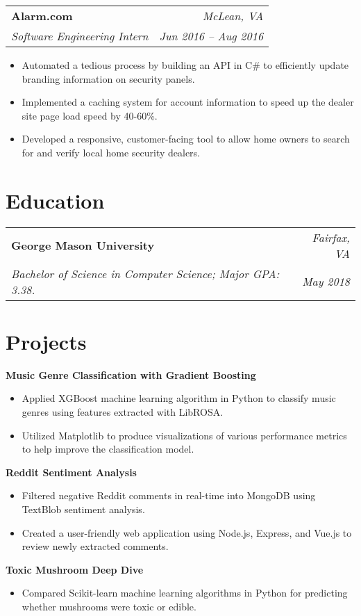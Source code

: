 \documentclass[letterpaper,10pt]{article}
\makeatletter
\newcommand{\resumeSectionBegin}[1]{\section{#1}}
\newcommand{\resumeSectionEnd}{\vspace{3pt}}
\newcommand{\resumeItemBegin}{\vspace{1pt}}
\newcommand{\resumeItemEnd}{\vspace{10pt}}
\newcommand{\resumeItemHeading}[4]{
  \begin{tabular*}{\textwidth}[t]{l@{\extracolsep{\fill}}r}
    {\large \textbf{#1}} & \textsl{#3}\vspace{3pt} \\
    {\large \textsl{#2}} & \textsl{#4} \\
  \end{tabular*}
}
\newcommand{\project}[1]{
  {\large \textbf{#1}}\vspace{1pt}
}
\makeatother
\begin{document}
  \resumeItemEnd
  \resumeItemBegin
    \resumeItemHeading{Alarm.com}{Software Engineering Intern}{McLean, VA}{Jun 2016 -- Aug 2016}
    \begin{itemize}
      \item Automated a tedious process by building an API in C\# to efficiently update branding information on security panels.
      \item Implemented a caching system for account information to speed up the dealer site page load speed by 40-60\%.
      \item Developed a responsive, customer-facing tool to allow home owners to search for and verify local home security dealers.
    \end{itemize}
  \resumeItemEnd
\resumeSectionEnd


\resumeSectionBegin{Education}
  \resumeItemBegin
    \resumeItemHeading{George Mason University}{Bachelor of Science in Computer Science; Major GPA: 3.38.}{Fairfax, VA}{May 2018}
  \resumeItemEnd
\resumeSectionEnd


\resumeSectionBegin{Projects}
  \resumeItemBegin
    \project{Music Genre Classification with Gradient Boosting}
    \begin{itemize}
      \item Applied XGBoost machine learning algorithm in Python to classify music genres using features extracted with LibROSA.
      \item Utilized Matplotlib to produce visualizations of various performance metrics to help improve the classification model.
    \end{itemize}
  \resumeItemEnd
  \resumeItemBegin
    \project{Reddit Sentiment Analysis}
    \begin{itemize}
      \item Filtered negative Reddit comments in real-time into MongoDB using TextBlob sentiment analysis.
      \item Created a user-friendly web application using Node.js, Express, and Vue.js to review newly extracted comments.
    \end{itemize}
  \resumeItemEnd
  \resumeItemBegin
    \project{Toxic Mushroom Deep Dive}
    \begin{itemize}
      \item Compared Scikit-learn machine learning algorithms in Python for predicting whether mushrooms were toxic or edible.
    \end{itemize}
  \resumeItemEnd
\resumeSectionEnd
\end{document}
